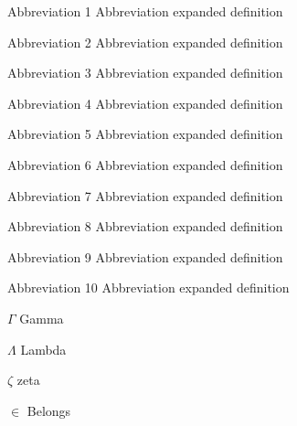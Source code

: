 \begin{siglas}
  \item[Abbreviation 1] Abbreviation expanded definition
  \item[Abbreviation 2] Abbreviation expanded definition
  \item[Abbreviation 3] Abbreviation expanded definition
  \item[Abbreviation 4] Abbreviation expanded definition
  \item[Abbreviation 5] Abbreviation expanded definition
  \item[Abbreviation 6] Abbreviation expanded definition
  \item[Abbreviation 7] Abbreviation expanded definition
  \item[Abbreviation 8] Abbreviation expanded definition
  \item[Abbreviation 9] Abbreviation expanded definition
  \item[Abbreviation 10] Abbreviation expanded definition
\end{siglas}


\begin{simbolos}
  \item[$ \Gamma $] Gamma
  \item[$ \Lambda $] Lambda
  \item[$ \zeta $] zeta
  \item[$ \in $] Belongs
\end{simbolos}


\cleardoublepage
